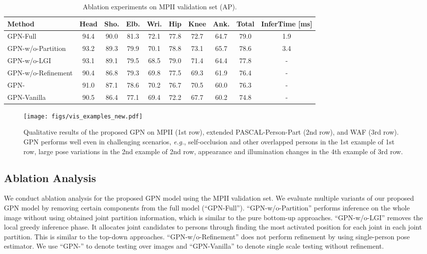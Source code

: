 \documentclass[10pt,twocolumn,letterpaper]{article}
\begin{document}
\begin{table}[t!]\scriptsize \caption{Ablation experiments on MPII validation set (AP).}
  \label{tab:ablation_analysis}
  \centering
  \setlength{\tabcolsep}{1.5pt}
  \begin{tabular}{lccccccccc}
    \toprule
Method   &Head & Sho. & Elb. & Wri. & Hip & Knee  & Ank. & Total & InferTime [ms]\\
     \midrule
     GPN-Full & 94.4 & 90.0     & 81.3  & 72.1 & 77.8 & 72.7 & 64.7  & 79.0 & 1.9\\
     \midrule
     GPN-w/o-Partition & 93.2 & 89.3     & 79.9  & 70.1 & 78.8 & 73.1 & 65.7  & 78.6  & 3.4\\
     GPN-w/o-LGI & 93.1 & 89.1     & 79.5  & 68.5 & 79.0 & 71.4 & 64.4  & 77.8 & - \\
     GPN-w/o-Refinement & 90.4 & 86.8     & 79.3  & 69.8 & 77.5 & 69.3 & 61.9  & 76.4 & -\\
     GPN- & 91.0 & 87.1     & 78.6  & 70.2 & 76.7 & 70.5 & 60.0  & 76.3 & -\\
     GPN-Vanilla & 90.5 & 86.4 & 77.1  & 69.4 & 72.2 & 67.7 & 60.2  & 74.8 & - \\
\bottomrule
  \end{tabular}
\end{table}





\begin{figure*}[t!]
\begin{center}
\texttt{[image: figs/vis\_examples\_new.pdf]}
\caption{Qualitative results of the proposed GPN on  MPII (1st row), extended PASCAL-Person-Part  (2nd row), and  WAF (3rd row). GPN performs well  even in  challenging scenarios, \emph{e.g.}, self-occlusion and other overlapped persons  in the 1st example of 1st row,
large pose variations  in the 2nd example of 2nd row, appearance and illumination changes in the 4th example of  3rd row.}
\label{fig:mpi_vis}
\end{center}
\vspace{-20pt}
\end{figure*}

\subsection{Ablation Analysis}

We conduct ablation analysis for the proposed GPN model using the  MPII validation set.  We evaluate multiple variants of our proposed GPN model by removing certain components from the full model (``GPN-Full'').  ``GPN-w/o-Partition''   performs inference on the whole image without using obtained joint partition information, which is similar to the pure bottom-up approaches.  ``GPN-w/o-LGI'' removes the local greedy inference phase. It allocates joint candidates to persons through finding the most activated  position for each  joint in each joint partition. This is similar to the top-down approaches.   ``GPN-w/o-Refinement'' does not perform refinement by using single-person pose estimator. We use ``GPN-'' to denote  testing over   images and ``GPN-Vanilla''  to denote single scale testing without refinement.
\end{document}
